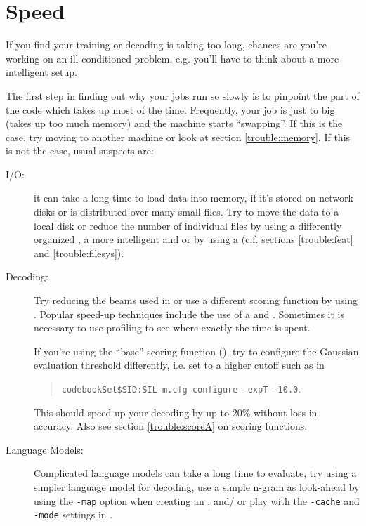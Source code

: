 \section{Speed} \label{trouble:speed}

If you find your training or decoding  is taking too long, chances are
you're  working  on an ill-conditioned problem,    e.g. you'll have to
think about a more intelligent setup.

The first step  in  finding out why your    jobs run so slowly  is  to
pinpoint the     part of  the   code   which takes   up   most  of the
time. Frequently, your job  is just to big (takes  up too much memory)
and the machine  starts ``swapping''. If this is  the case, try moving
to another machine or look at section \ref{trouble:memory}. If this is
not the case, usual suspects are:

\begin{description}

\item[I/O:] it can take a long time to  load data into memory, if it's
stored on network disks or  is distributed over  many small files. Try
to move the  data to a local disk  or reduce the  number of individual
files by  using  a differently organized  , a more
intelligent   and   or  by
using a  (c.f.  sections \ref{trouble:feat} and
\ref{trouble:filesys}).

\item[Decoding:] Try  reducing the  beams used in 
or    use     a     different     scoring    function    by      using
. Popular speed-up techniques include the
use of a    and .  Sometimes
it is necessary  to  use profiling to  see  where exactly the  time is
spent.

If      you're   using    the      ``base''     scoring       function
(),  try      to configure   the Gaussian
evaluation threshold  differently,  i.e. set  to  a
higher cutoff such as in

\begin{quote}
\texttt{codebookSet\$SID:SIL-m.cfg configure -expT -10.0}.
\end{quote}

This  should  speed up your  decoding by  up  to 20\%  without loss in
accuracy. Also see section \ref{trouble:scoreA} on scoring functions.

\item[Language Models:] Complicated  language  models can take a  long
time to evaluate, try using a simpler language model for decoding, use
a  simple  n-gram   as  look-ahead  by using  the
\texttt{-map} option when  creating  an ,  and/ or
play  with   the \texttt{-cache}    and \texttt{-mode}   settings   in
.

\end{description}

